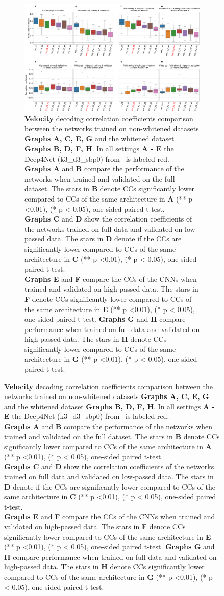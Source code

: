 \begin{figure}[!htbp]
\begin{subfigure}[a]{\textwidth}
   \includegraphics[width=1\linewidth]{img/ch4/vel-pw-vs-non-pw-performance}
   \caption{\textbf{Velocity} decoding correlation coefficients comparison between the networks trained on non-whitened datasets \textbf{Graphs A, C, E, G} and the whitened dataset \textbf{Graphs B, D, F, H}.
   In all settings \textbf{A - E} the Deep4Net (k3\_d3\_sbp0) from~\cite{Hammer-2021} is labeled red.
   \\ \textbf{Graphs A} and \textbf{B} compare the performance of the networks when trained and validated on the full dataset.
   The stars in \textbf{B} denote CCs significantly lower compared to CCs of the same architecture in \textbf{A} (** p <0.01), (* p < 0.05), one-sided paired t-test.
   \\\textbf{Graphs C} and \textbf{D} show the correlation coefficients of the networks trained on full data and validated on low-passed data.
   The stars in \textbf{D} denote if the CCs are significantly lower compared to CCs of the same architecture in \textbf{C} (** p <0.01), (* p < 0.05), one-sided paired t-test.
   \\\textbf{Graphs E} and \textbf{F} compare the CCs of the CNNs when trained and validated on high-passed data.
   The stars in \textbf{F} denote CCs significantly lower compared to CCs of the same architecture in \textbf{E} (** p <0.01), (* p < 0.05), one-sided paired t-test.
   \textbf{Graphs G} and \textbf{H} compare performance when trained on full data and validated on high-passed data.
   The stars in \textbf{H} denote CCs significantly lower compared to CCs of the same architecture in \textbf{G} (** p <0.01), (* p < 0.05), one-sided paired t-test.}
\end{subfigure}\label{fig:vel-pw-performance}
\end{figure}
\clearpage   

